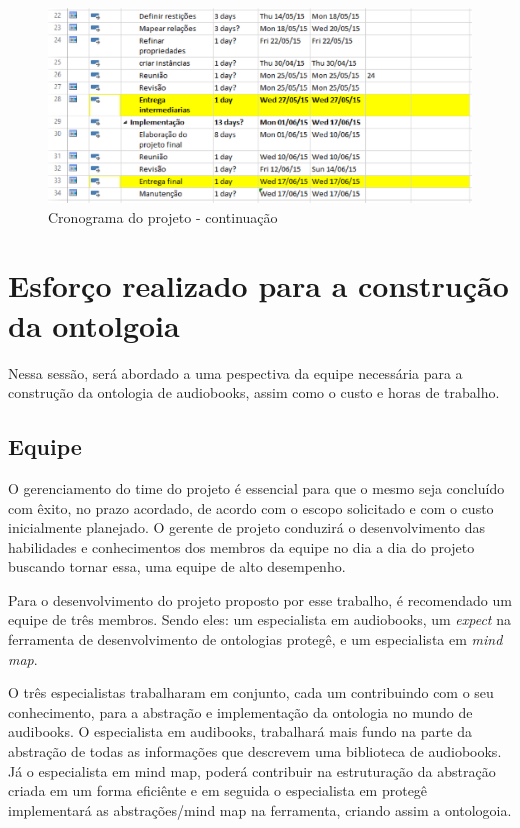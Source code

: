  \begin{figure}[ht]
  \centering
    \includegraphics[keepaspectratio=true,scale=0.5]{figuras/cronograma.eps}
  \caption{Cronograma do projeto - continuação}
\end{figure}

\section{Esforço realizado para a construção da ontolgoia}

Nessa sessão, será abordado a uma pespectiva da equipe necessária para a construção da ontologia de audiobooks, assim como o custo e horas de trabalho.

\subsection{Equipe}

O gerenciamento do time do projeto é essencial para que o mesmo seja concluído com êxito, no prazo acordado, de acordo com o escopo solicitado e com o custo inicialmente planejado. O gerente de projeto conduzirá o desenvolvimento das habilidades e conhecimentos dos membros da equipe no dia a dia do projeto buscando tornar essa, uma equipe de alto desempenho. \cite{CHIAVENATO}

Para o desenvolvimento do projeto proposto por esse trabalho, é recomendado um equipe de três membros. Sendo eles: um especialista em audiobooks, um \textit{expect} na ferramenta de desenvolvimento de ontologias protegê, e um especialista em \textit{mind map}.

O três especialistas trabalharam em conjunto, cada um contribuindo com o seu conhecimento, para a abstração e implementação da ontologia no mundo de audibooks.
O especialista em audibooks, trabalhará mais fundo na parte da abstração de todas as informações que descrevem uma biblioteca de audiobooks. 
Já o especialista em mind map, poderá contribuir na estruturação da abstração criada em um forma eficiênte e em seguida o especialista em protegê implementará as abstrações/mind map na ferramenta, criando assim a ontologoia.

